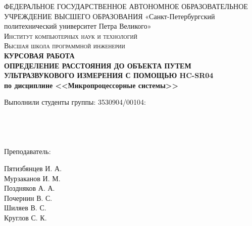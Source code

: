 \documentclass[a4paper, 14pt]{article}
\begin{document}
\begin{titlepage}
	\center

	ФЕДЕРАЛЬНОЕ ГОСУДАРСТВЕННОЕ АВТОНОМНОЕ ОБРАЗОВАТЕЛЬНОЕ УЧРЕЖДЕНИЕ ВЫСШЕГО ОБРАЗОВАНИЯ\linebreak
	«Санкт-Петербургский политехнический университет Петра Великого»\\[1cm]
	\textsc{\Large Институт компьютерных наук и технологий}\\
	\textsc{\large Высшая школа программной инженерии}\\[3.5cm]

	{ \huge \bfseries КУРСОВАЯ РАБОТА	\\
	\Large \mdseries ОПРЕДЕЛЕНИЕ РАССТОЯНИЯ ДО ОБЪЕКТА ПУТЕМ УЛЬТРАЗВУКОВОГО ИЗМЕРЕНИЯ С ПОМОЩЬЮ HC-SR04 \\
	\large по дисциплине <<Микропроцессорные системы>>}\\[6.5cm]


	\begin{multicols}{2}
		\begin{flushright} \large

			{Выполнили студенты группы: 3530904/00104:}\\
			{\phantom{qwe}}\\
			{\phantom{qwe}}\\
			{\phantom{qwe}}\\
			{\phantom{qwe}}\\

			{Преподаватель:\\}

		\end{flushright}
		\begin{flushright}

			{Пятизбянцев И. А.}\\
			{Мурзаканов И. М.}\\
			{Поздняков А. А.}\\
			{Почернин В. С.}\\
			{Шиляев В. С.}\\[0.5cm]


			Круглов С. К.\\

		\end{flushright}
	\end{multicols}

	\flushright{
	{\phantom{qwe}}\\[4.5cm]
	{\today}\\
	}

	\vfill
\end{titlepage}
\end{document}

